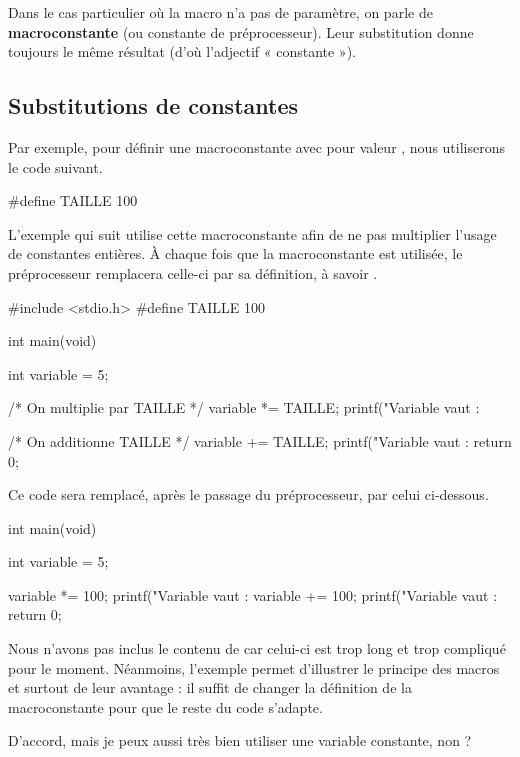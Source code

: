 Dans le cas particulier où la macro n'a pas de paramètre, on parle de
\textbf{macroconstante} (ou constante de préprocesseur). Leur
substitution donne toujours le même résultat (d'où l'adjectif «
constante »).

\subsection{Substitutions de constantes}
\label{substitutions-de-constantes}

Par exemple, pour définir une macroconstante  avec pour
valeur , nous utiliserons le code suivant.

\begin{C}
#define TAILLE 100
\end{C}

L'exemple qui suit utilise cette macroconstante afin de ne pas
multiplier l'usage de constantes entières. À chaque fois que la
macroconstante  est utilisée, le préprocesseur remplacera
celle-ci par sa définition, à savoir .

\begin{C}
#include <stdio.h>
#define TAILLE 100

int main(void)
{
    int variable = 5;

    /* On multiplie par TAILLE */
    variable *= TAILLE;
    printf("Variable vaut : %

    /* On additionne TAILLE */
    variable += TAILLE;
    printf("Variable vaut : %
    return 0;
}
\end{C}

Ce code sera remplacé, après le passage du préprocesseur, par celui
ci-dessous.

\begin{C}
int main(void)
{
    int variable = 5;

    variable *= 100;
    printf("Variable vaut : %
    variable += 100;
    printf("Variable vaut : %
    return 0;
}
\end{C}

Nous n'avons pas inclus le contenu de
 car celui-ci est trop long et
trop compliqué pour le moment. Néanmoins, l'exemple permet d'illustrer
le principe des macros et surtout de leur avantage : il suffit de
changer la définition de la macroconstante  pour que le
reste du code s'adapte.

\begin{questionbox} 
 D'accord, mais je peux aussi très bien
utiliser une variable constante, non ?
\end{questionbox}


